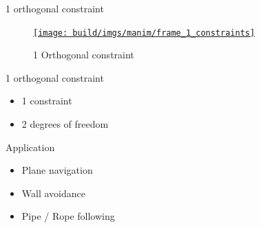 \documentclass[10pt, xcolor={usenames, dvipsnames}]{beamer}
\begin{document}
        \begin{frame}{1 orthogonal constraint}
            \begin{minipage}{0.33\textwidth}
                \begin{figure}
                    \centering
                    \href{run:frame_1_constraints.mp4?autostart&loop}{\texttt{[image: build/imgs/manim/frame\_1\_constraints]}}
                    \caption{1 Orthogonal constraint}
                \end{figure}
            \end{minipage}
            \hfill
            \begin{minipage}{0.6\textwidth}
                \begin{block}{1 orthogonal constraint}
                    \vspace*{.25cm}
                    \begin{itemize}
                        \item 1 constraint
                        \item 2 degrees of freedom
                    \end{itemize}
                \end{block}
                \begin{block}{Application}
                    \begin{itemize}
                        \item Plane navigation
                        \item Wall avoidance
                        \item Pipe / Rope following
                    \end{itemize}
                \end{block}
            \end{minipage}
        \end{frame}
\end{document}
